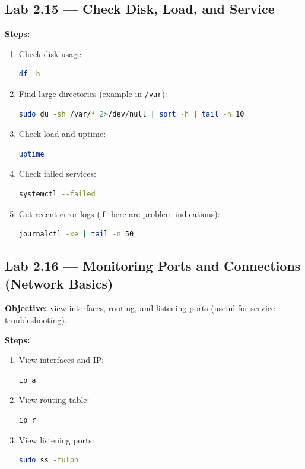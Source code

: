 \subsection*{Lab 2.15 --- Check Disk, Load, and Service}
\textbf{Steps:}
\begin{enumerate}
    \item Check disk usage:
\begin{lstlisting}[language=bash, caption={Check disk capacity}]
df -h
\end{lstlisting}

    \item Find large directories (example in \texttt{/var}):
\begin{lstlisting}[language=bash, caption={Check directory size (example /var)}]
sudo du -sh /var/* 2>/dev/null | sort -h | tail -n 10
\end{lstlisting}

    \item Check load and uptime:
\begin{lstlisting}[language=bash, caption={Check load average}]
uptime
\end{lstlisting}

    \item Check failed services:
\begin{lstlisting}[language=bash, caption={Failed services}]
systemctl --failed
\end{lstlisting}

    \item Get recent error logs (if there are problem indications):
\begin{lstlisting}[language=bash, caption={Recent error logs}]
journalctl -xe | tail -n 50
\end{lstlisting}
\end{enumerate}

\subsection*{Lab 2.16 --- Monitoring Ports and Connections (Network Basics)}
\textbf{Objective:} view interfaces, routing, and listening ports (useful for service troubleshooting).

\textbf{Steps:}
\begin{enumerate}
    \item View interfaces and IP:
\begin{lstlisting}[language=bash, caption={Check IP address}]
ip a
\end{lstlisting}

    \item View routing table:
\begin{lstlisting}[language=bash, caption={Check routing}]
ip r
\end{lstlisting}

    \item View listening ports:
\begin{lstlisting}[language=bash, caption={Check listening ports}]
sudo ss -tulpn
\end{lstlisting}
\end{enumerate}


